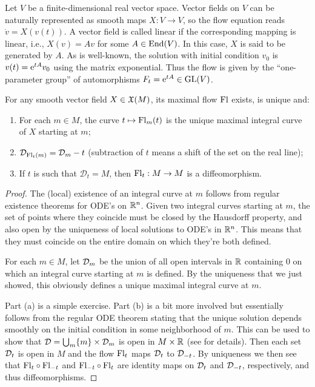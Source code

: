 \begin{example}
    Let $V$ be a finite-dimensional real vector space.  Vector fields on $V$ can be naturally represented as smooth maps $X:V\to V$, so the flow equation reads $\dot v=X(v(t))$. A vector field is called linear if the corresponding mapping is linear, i.e., $X(v)=Av$ for some $A\in\operatorname{End}(V)$. In this case, $X$ is said to be generated by $A$. As is well-known, the solution with initial condition $v_0$ is $v(t)=\mathrm{e}^{tA}v_0$ using the matrix exponential. Thus the flow is given by the ``one-parameter group'' of automorphisms $F_t=\mathrm{e}^{tA}\in \operatorname{GL}(V)$.
\end{example}

\begin{thm}\label{thm fundamental of flows}
    For any smooth vector field $X\in\mathfrak{X}(M)$, its maximal flow $\mathrm{Fl}$ exists, is unique and:
    \begin{enumerate}
        \item For each $m\in M$, the curve $t\mapsto \mathrm{Fl}_m(t)$ is the unique maximal integral curve of $X$ starting at $m$;
        \item $\mathcal{D}_{\mathrm{Fl}_t(m)}=\mathcal{D}_m-t$ (subtraction of $t$ means a shift of the set on the real line);
        \item If $t$ is such that $\mathcal{D}_t=M$, then $\mathrm{Fl}_t:M\to M$ is a diffeomorphism.
    \end{enumerate}
\end{thm}
\begin{proof}
    The (local) existence of an integral curve at $m$ follows from regular existence theorems for ODE's on $\mathbb{R}^n$. Given two integral curves starting at $m$, the set of points where they coincide must be closed by the Hausdorff property, and also open by the uniqueness of local solutions to ODE's in $\mathbb{R}^n$. This means that they must coincide on the entire domain on which they're both defined.

    For each $m\in M$, let $\mathcal{D}_m$ be the union of all open intervals in $\mathbb{R}$ containing $0$ on which an integral curve starting at $m$ is defined. By the uniqueness that we just showed, this obviously defines a unique maximal integral curve at $m$.

    Part (a) is a simple exercise. Part (b) is a bit more involved but essentially follows from the regular ODE theorem stating that the unique solution depends smoothly on the initial condition in some neighborhood of $m$. This can be used to show that $\mathcal{D}=\bigcup_m \{m\}\times \mathcal{D}_m$ is open in $M\times\mathbb{R}$ (see \cite[Thm.~9.12]{Lee} for details). Then each set $\mathcal{D}_t$ is open in $M$ and the flow $\mathrm{Fl}_t$ maps $\mathcal{D}_t$ to $\mathcal{D}_{-t}$. By uniqueness we then see that $\mathrm{Fl}_t\circ \mathrm{Fl}_{-t}$ and $\mathrm{Fl}_{-t}\circ \mathrm{Fl}_t$ are identity maps on $\mathcal{D}_t$ and $\mathcal{D}_{-t}$, respectively, and thus diffeomorphisms.
\end{proof}



